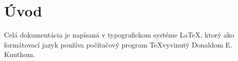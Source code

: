 \chapter{Úvod}


Celá dokumentácia je napísaná v typografickom systéme \LaTeX, ktorý ako formátovací jazyk používa počítačový program \TeX  vyvinutý Donaldom E. Knuthom.